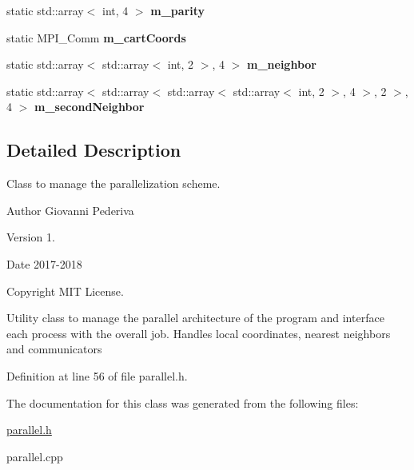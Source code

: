 \begin{DoxyCompactItemize}
\item 
static std\+::array$<$ int, 4 $>$ {\bfseries m\+\_\+parity}\hypertarget{classParallel_a01f36b6b5f23733bb9e5ef537787f6fa}{}\label{classParallel_a01f36b6b5f23733bb9e5ef537787f6fa}

\item 
static M\+P\+I\+\_\+\+Comm {\bfseries m\+\_\+cart\+Coords}\hypertarget{classParallel_a522bd2939de7adbb0413bb14352a4172}{}\label{classParallel_a522bd2939de7adbb0413bb14352a4172}

\item 
static std\+::array$<$ std\+::array$<$ int, 2 $>$, 4 $>$ {\bfseries m\+\_\+neighbor}\hypertarget{classParallel_ac3c55e557814bf2ceff5f0561dfcc2d4}{}\label{classParallel_ac3c55e557814bf2ceff5f0561dfcc2d4}

\item 
static std\+::array$<$ std\+::array$<$ std\+::array$<$ std\+::array$<$ int, 2 $>$, 4 $>$, 2 $>$, 4 $>$ {\bfseries m\+\_\+second\+Neighbor}\hypertarget{classParallel_af69b636eab0ecd9d4a5066b38bfdc979}{}\label{classParallel_af69b636eab0ecd9d4a5066b38bfdc979}

\end{DoxyCompactItemize}


\subsection{Detailed Description}
Class to manage the parallelization scheme. 

\begin{DoxyAuthor}{Author}
Giovanni Pederiva 
\end{DoxyAuthor}
\begin{DoxyVersion}{Version}
1. 
\end{DoxyVersion}
\begin{DoxyDate}{Date}
2017-\/2018 
\end{DoxyDate}
\begin{DoxyCopyright}{Copyright}
M\+IT License.
\end{DoxyCopyright}
Utility class to manage the parallel architecture of the program and interface each process with the overall job. Handles local coordinates, nearest neighbors and communicators 

Definition at line 56 of file parallel.\+h.



The documentation for this class was generated from the following files\+:\begin{DoxyCompactItemize}
\item 
\hyperlink{parallel_8h}{parallel.\+h}\item 
parallel.\+cpp\end{DoxyCompactItemize}
